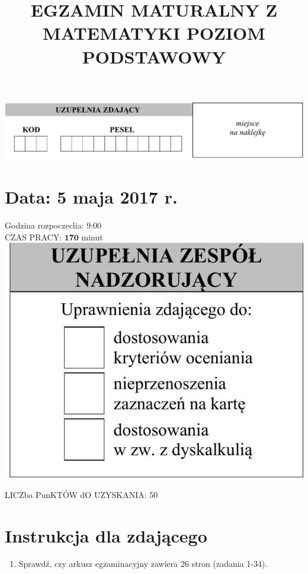\documentclass[10pt]{article}
\title{EGZAMIN MATURALNY Z MATEMATYKI POZIOM PODSTAWOWY }
\author{}
\date{}
\begin{document}
\maketitle
\begin{center}
\includegraphics[max width=\textwidth]{2024_11_21_7b5527312ea89ae66fd0g-01(1)}
\end{center}

\section*{Data: 5 maja 2017 r.}
Godzina rozpoczeclia: 9:00\\
CZAS PRACY: \(\mathbf{1 7 0}\) minut\\
\includegraphics[max width=\textwidth, center]{2024_11_21_7b5527312ea89ae66fd0g-01}

LICZba PunKTÓW dO UZYSKANIA: 50

\section*{Instrukcja dla zdającego}
\begin{enumerate}
  \item Sprawdź, czy arkusz egzaminacyjny zawiera 26 stron (zadania 1-34).
\end{enumerate}
\end{document}
